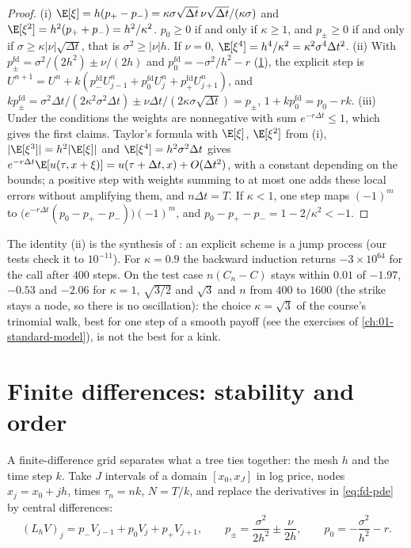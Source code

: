 \begin{proof}
(i) $\E[\xi]=h(p_+-p_-)=\kappa\sigma\sqrt{\Delta t}\,\nu\sqrt{\Delta t}/(\kappa\sigma)$ and $\E[\xi^2]=h^2(p_++p_-)=h^2/\kappa^2$.
$p_0\ge0$ if and only if $\kappa\ge1$, and $p_\pm\ge0$ if and only if $\sigma\ge\kappa|\nu|\sqrt{\Delta t}$, that is
$\sigma^2\ge|\nu|h$. If $\nu=0$, $\E[\xi^4]=h^4/\kappa^2=\kappa^2\sigma^4\Delta t^2$.
(ii) With $p_\pm^{\mathrm{fd}}=\sigma^2/(2h^2)\pm\nu/(2h)$ and $p_0^{\mathrm{fd}}=-\sigma^2/h^2-r$ (\cref{sec:fd-schemes}), the
explicit step is $U^{n+1}=U^n+k(p_-^{\mathrm{fd}}U^n_{j-1}+p_0^{\mathrm{fd}}U^n_j+p_+^{\mathrm{fd}}U^n_{j+1})$, and
$kp^{\mathrm{fd}}_\pm=\sigma^2\Delta t/(2\kappa^2\sigma^2\Delta t)\pm\nu\Delta t/(2\kappa\sigma\sqrt{\Delta t})=p_\pm$, $1+kp^{\mathrm{fd}}_0=p_0-rk$.
(iii) Under the conditions the weights are nonnegative with sum $e^{-r\Delta t}\le1$, which gives the
first claims. Taylor's formula with $\E[\xi]$, $\E[\xi^2]$ from (i), $|\E[\xi^3]|=h^2|\E[\xi]|$ and
$\E[\xi^4]=h^2\sigma^2\Delta t$ gives $e^{-r\Delta t}\E[u(\tau,x+\xi)]=u(\tau+\Delta t,x)+O(\Delta t^2)$, with a constant
depending on the bounds; a positive step with weights summing to at most one adds these local
errors without amplifying them, and $n\Delta t=T$. If $\kappa<1$, one step maps $(-1)^m$ to
$\big(e^{-r\Delta t}(p_0-p_+-p_-)\big)(-1)^m$, and $p_0-p_+-p_-=1-2/\kappa^2<-1$.
\end{proof}

The identity (ii) is the synthesis of \textcite{brennan-schwartz-1978}: an explicit scheme is a
jump process (our tests check it to $10^{-11}$). For $\kappa=0.9$ the backward induction returns
$-3\times10^{64}$ for the call after $400$ steps. On the test case $n(C_n-C)$ stays within $0.01$ of
$-1.97$, $-0.53$ and $-2.06$ for $\kappa=1$, $\sqrt{3/2}$ and $\sqrt3$ and $n$ from $400$ to $1600$ (the strike
stays a node, so there is no oscillation): the choice $\kappa=\sqrt3$ of the course's trinomial walk, best for one step of a smooth
payoff (see the exercises of \cref{ch:01-standard-model}), is not the best for a kink.

\section{Finite differences: stability and order}\label{sec:fd-schemes}

A finite-difference grid separates what a tree ties together: the mesh $h$ and the time step
$k$. Take $J$ intervals of a domain $[x_0,x_J]$ in log price, nodes $x_j=x_0+jh$, times $\tau_n=nk$,
$N=T/k$, and replace the derivatives in \eqref{eq:fd-pde} by central differences:
\[
  (L_hV)_j=p_-V_{j-1}+p_0V_j+p_+V_{j+1},\qquad p_\pm=\frac{\sigma^2}{2h^2}\pm\frac{\nu}{2h},\qquad p_0=-\frac{\sigma^2}{h^2}-r .
\]

